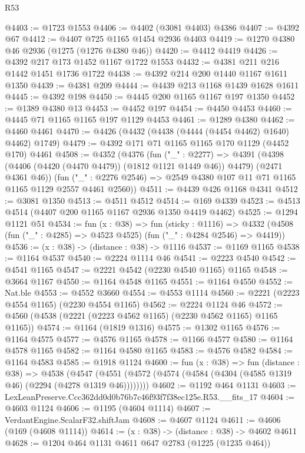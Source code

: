 \begin{lexlean}{R53}
\begin{coremodule}
@4403 := @1723 @1553
@4406 := @4402 (@3081 @4403) @4386
@4407 := @4392 @67
@4412 := @4407 @725 @1165 @1454 @2936 @4403
@4419 := @1270 @4380 @46 @2936 (@1275 (@1276 @4380 @46))
@4420 := @4412 @4419
@4426 := @4392 @217 @173 @1452 @1167 @1722 @1553
@4432 := @4381 @211 @216 @1442 @1451 @1736 @1722
@4438 := @4392 @214 @200 @1440 @1167 @1611 @1350
@4439 := @4381 @209
@4444 := @4439 @213 @1168 @1439 @1628 @1611
@4445 := @4392 @198
@4450 := @4445 @200 @1165 @1167 @197 @1350
@4452 := @1389 @4380 @13
@4453 := @4452 @197
@4454 := @4450 @4453
@4460 := @4445 @71 @1165 @1165 @197 @1129 @4453
@4461 := @1289 @4380
@4462 := @4460 @4461
@4470 := @4426 (@4432 (@4438 (@4444 (@4454 @4462) @1640) @4462) @1749)
@4479 := @4392 @171 @71 @1165 @1165 @170 @1129 (@4452 @170) @4461
@4508 := @4352
    (@4376
      (fun ("_" : @2277) =>
      @4391 (@4398 (@4406 (@4420 (@4470 @4479)) (@1812 @1121 @1449 @46)) @4479) (@2471 @4361 @46))
      (fun ("_" : @2276 @2546) => @2549 @4380 @107 @11 @71 @1165 @1165 @1129 @2557 @4461 @2560))
@4511 := @4439 @426 @1168 @4341
@4512 := @3081 @1350
@4513 := @4511 @4512
@4514 := @169 @4339
@4523 := @4513 @4514 (@4407 @200 @1165 @1167 @2936 @1350 @4419 @4462)
@4525 := @1294 @1121 @51
@4534 := fun (x : @38) =>
  fun (sticky : @1116) =>
  @4332 (@4508 (fun ("_" : @4285) => @4523 @4525) (fun ("_" : @4284 @2546) => @4419))
@4536 := (x : @38) -> (distance : @38) -> @1116
@4537 := @1169 @1165
@4538 := @1164 @4537
@4540 := @2224 @1114 @46
@4541 := @2223 @4540
@4542 := @4541 @1165
@4547 := @2221 @4542 (@2230 @4540 @1165) @1165
@4548 := @3664 @1167
@4550 := @1164 @4548 @1165
@4551 := @1164 @4550
@4552 := Nat.ble
@4553 := @4552 @3660
@4554 := @4553 @1114
@4560 := @2221 (@2223 @4554 @1165) (@2230 @4554 @1165)
@4562 := @2224 @1124 @46
@4572 := @4560 (@4538 (@2221 (@2223 @4562 @1165) (@2230 @4562 @1165) @1165 @1165))
@4574 := @1164 (@1819 @1316)
@4575 := @1302 @1165
@4576 := @1164 @4575
@4577 := @4576 @1165
@4578 := @1166 @4577
@4580 := @1164 @4578 @1165
@4582 := @1164 @4580 @1165
@4583 := @4576 @4582
@4584 := @1164 @4583
@4585 := @1918 @1124
@4600 := fun (x : @38) =>
  fun (distance : @38) =>
  @4538 (@4547 (@4551 (@4572 (@4574 (@4584 (@4304 (@4585 @1319 @46) (@2294 (@4278 @1319 @46))))))))
@4602 := @1192 @464 @1131
@4603 := LexLeanPreserve.Ccc362dd0d0b76b7c46f93f7f38ec125e.R53.__fits_17
@4604 := @4603 @1124
@4606 := @1195 (@4604 @1114)
@4607 := VerdantEngine.ScalarF32.shiftJam
@4608 := @4607 @1124
@4611 := @4606 (@169 (@4608 @1114))
@4614 := (x : @38) -> (distance : @38) -> @4602 @4611
@4628 := @1204
    @464
    @1131
    @4611
    @647
    @2783
    (@1225 (@1235 @464))

\end{coremodule}
\end{lexlean}
